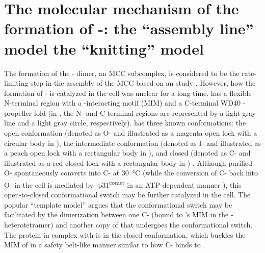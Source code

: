 \section{The molecular mechanism of the formation of -: the ``assembly line'' model  the ``knitting'' model}
\label{TwoModels}


The formation of the - dimer, an MCC subcomplex, is considered to be the rate-limiting step in the assembly of the MCC based on an  study \cite{Faesen2017}. However, how the formation of - is catalyzed in the cell was unclear for a long time.  has a flexible N-terminal region with a -interacting motif (MIM) and a C-terminal WD40 \textbeta{}-propeller fold \cite{CDC20-KEN} (in , the N- and C-terminal regions are represented by a light gray line and a light gray circle, respectively).  has three known conformations: the open conformation (denoted as O- and illustrated as a magenta open lock with a circular body in ), the intermediate conformation (denoted as I- and illustrated as a peach open lock with a rectangular body in ), and closed (denoted as C- and illustrated as a red closed lock with a rectangular body in ) \cite{I-MAD2}. Although purified O- spontaneously converts into C- at \SI{30}{\celsius}  \cite{O-CSpontaneousConversion} (while the conversion of C- back into O- in the cell is mediated by -p31\textsuperscript{comet} in an ATP-dependent manner \cite{TRIP13-p31-MAD2}), this open-to-closed conformational switch may be further catalyzed in the cell. The popular ``template model'' \cite{TemplateModel} argues that the conformational switch may be facilitated by the dimerization between one C- (bound to 's MIM in the - heterotetramer) and another copy of  that undergoes the conformational switch. The  protein in complex with  is in the closed conformation, which buckles the MIM of  in a safety belt-like manner similar to how C- binds to  \cite{Structure1GO4, SpMCC}.%


